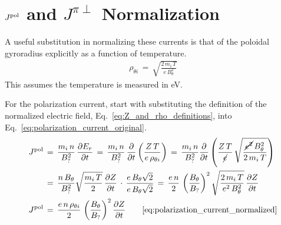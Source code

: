 \section{\texorpdfstring{$J^\textnormal{pol}$}{J pol} and \texorpdfstring{$J^{\pi\perp}$}{J bulk} Normalization}\label{chapter:Normalization}
A useful substitution in normalizing these currents is that of the poloidal gyroradius explicitly as a function of temperature.
\begin{align} %
	\rho_{\theta i} \,=\, \sqrt{\frac{2 \, m_i \, T}{e \, B_\theta^2}}
\end{align}
This assumes the temperature is measured in eV.

For the polarization current, start with substituting the definition of the normalized electric field, Eq.~\ref{eq:Z_and_rho_definitions}, into Eq.~\ref{eq:polarization_current_original}.
\begin{align} %
	J^\text{pol} \,&=\, \frac{m_i\,n}{B_?^2}\, \frac{\partial E_r}{\partial t}
		\,=\, \frac{m_i \, n}{B_?^2} \, \frac{\partial}{\partial t}
		\left(\frac{Z \, T}{e \, \rho_{\theta i}}\right)
		\,=\, \frac{m_i \, n}{B_?^2} \frac{\partial}{\partial t}
		\left(\frac{Z \, T}{\cancel{e}} \, \sqrt{\frac{\cancel{e^2} \,
		B_\theta^2}{2 \, m_i \, T}} \right) \\
	&=\, \frac{n \, B_\theta}{B_?^2} \sqrt{\frac{m_i \, T}{2}} \,
		\frac{\partial Z}{\partial t} \,\cdot\, \frac{e\,B_\theta\sqrt{2}}
		{e\,B_\theta\sqrt{2}}
		\,=\, \frac{e \, n}{2} \, \left(\frac{B_\theta}{B_?}\right)^2
		\sqrt{\frac{2 \, m_i \, T}{e^2 \, B_\theta^2}} \,
		\frac{\partial Z}{\partial t} \\
	J^\text{pol} \,&=\, \frac{e \, n \, \rho_{\theta i}}{2} \,
		\left(\frac{B_\theta}{B_?}\right)^2 \frac{\partial Z}{\partial t}
		\tag*{\eqref{eq:polarization_current_normalized}}
\end{align}

